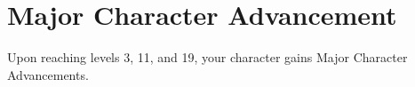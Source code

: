 \section{Major Character Advancement} \label{sec::majorcharacteradvancement}
Upon reaching levels 3, 11, and 19, your character gains Major Character Advancements.
